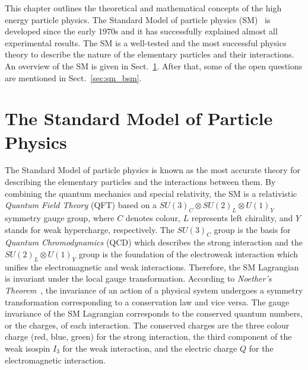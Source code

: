 This chapter outlines the theoretical and mathematical concepts of the high energy particle physics.
The Standard Model of particle physics (SM)~\cite{Salam:1968rm, Glashow:1961tr, Weinberg:1967tq, Herrero:1998eq, Cottingham:2007zz} is developed since the early 1970s and it has successfully explained almost all experimental results.
The SM is a well-tested and the most successful physics theory to describe the nature of the elementary particles and their interactions.
An overview of the SM is given in Sect.~\ref{sec:sm}.
After that, some of the open questions are mentioned in Sect.~\ref{sec:sm_bsm}.


\section{The Standard Model of Particle Physics}
\label{sec:sm}
The Standard Model of particle physics is known as the most accurate theory for describing the elementary particles and the interactions between them.
By combining the quantum mechanics and special relativity, the SM is a relativistic \textit{Quantum Field Theory} (QFT) based on a $SU(3)_{C} \otimes SU(2)_{L} \otimes U(1)_{Y}$ symmetry gauge group, where $C$ denotes colour, $L$ represents left chirality, and $Y$ stands for weak hypercharge, respectively.
The $SU(3)_{C}$ group is the basis for \textit{Quantum Chromodynamics} (QCD) which describes the strong interaction and the $SU(2)_{L} \otimes U(1)_{Y}$ group is the foundation of the electroweak interaction which unifies the electromagnetic and weak interactions.
Therefore, the SM Lagrangian is invariant under the local gauge transformation.
According to \textit{Noether's Theorem}~\cite{Noether:1918zz}, the invariance of an action of a physical system undergoes a symmetry transformation corresponding to a conservation law and vice versa. 
The gauge invariance of the SM Lagrangian corresponds to the conserved quantum numbers, or the charges, of each interaction.
The conserved charges are the three colour charge (red, blue, green) for the strong interaction, the third component of the weak isospin $I_{3}$ for the weak interaction, and the electric charge $Q$ for the electromagnetic interaction.



